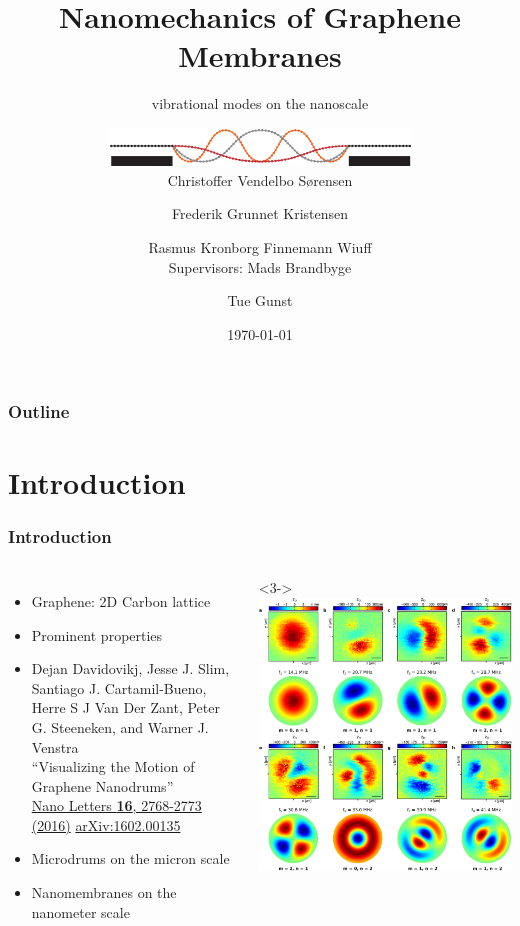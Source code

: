 \documentclass[hyperref={colorlinks=true,urlcolor=blue,linkcolor=.},aspectratio=1610,mathserif]{beamer}
\title{Nanomechanics of Graphene Membranes}
\subtitle{vibrational modes on the nanoscale}
\author{\centering\includegraphics[width=8cm]{Miscellaneous/Graphics/Logo.eps}\\Christoffer Vendelbo Sørensen \and Frederik Grunnet Kristensen \and Rasmus Kronborg Finnemann Wiuff\\Supervisors: Mads Brandbyge \and Tue Gunst}
\institute{Technical University of Denmark}
\date{\today}
\begin{document}
\begin{frame}[plain]
 \titlepage
\end{frame}

\begin{frame}[plain]
 \frametitle{Outline}
 \tableofcontents
\end{frame}

\section{Introduction}

\begin{frame}
 \frametitle{Introduction}
 \begin{columns}[T]
  \begin{itemize}
   \item<1-> Graphene: 2D Carbon lattice
   \item<2-> Prominent properties
   \item<3-> Dejan Davidovikj, Jesse J. Slim, Santiago J. Cartamil-Bueno, Herre S J Van Der Zant, Peter G. Steeneken, and Warner J. Venstra\\
         “Visualizing the Motion of Graphene Nanodrums”\\
         \href{http://dx.doi.org/10.1021/acs.nanolett.6b00477}{Nano Letters \textbf{16}, 2768-2773 (2016)} \href{http://arxiv.org/abs/1602.00135}{arXiv:1602.00135}
   \item<4-> Microdrums on the micron scale
   \item<5-> Nanomembranes on the nanometer scale
  \end{itemize}
  <3->
  \includegraphics[width=\columnwidth]{Figures/motivation.eps}

\end{columns}
\end{frame}
\end{document}
